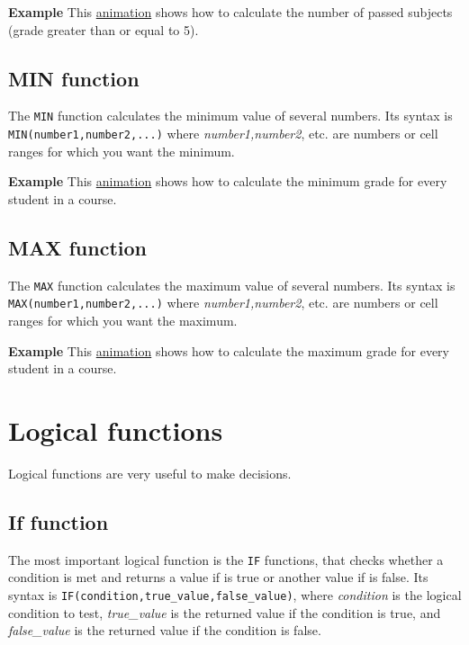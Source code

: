 \textbf{Example} This \href{http://aprendeconalf.es/office/excel/manual/img/example_function_countif.gif}{animation} shows how to calculate the number of passed subjects (grade greater than or equal to 5).

\subsection{MIN function}\hypertarget{min-function}{}\label{min-function}

The \texttt{MIN} function calculates the minimum value of several numbers. Its syntax is \texttt{MIN(number1,number2,...)} where \emph{number1,number2}, etc. are numbers or cell ranges for which you want the minimum.

\textbf{Example} This \href{http://aprendeconalf.es/office/excel/manual/img/example_function_min.gif}{animation} shows how to calculate the minimum grade for every student in a course.

\subsection{MAX function}\hypertarget{max-function}{}\label{max-function}

The \texttt{MAX} function calculates the maximum value of several numbers. Its syntax is \texttt{MAX(number1,number2,...)} where \emph{number1,number2}, etc. are numbers or cell ranges for which you want the maximum.

\textbf{Example} This \href{http://aprendeconalf.es/office/excel/manual/img/example_function_max.gif}{animation} shows how to calculate the maximum grade for every student in a course.

\section{Logical functions}\hypertarget{logical-functions}{}\label{logical-functions}

Logical functions are very useful to make decisions.

\subsection{If function}\hypertarget{if-function}{}\label{if-function}

The most important logical function is the \texttt{IF} functions, that checks whether a condition is met and returns a value if is true or another value if is false. Its syntax is \texttt{IF(condition,true\_value,false\_value)}, where \emph{condition} is the logical condition to test, \emph{true\_value} is the returned value if the condition is true, and \emph{false\_value} is the returned value if the condition is false.

